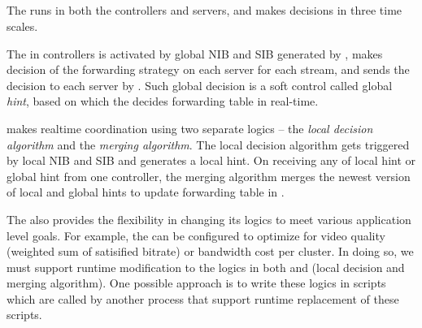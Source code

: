\subsection{\Decision}

The \decision runs in both the controllers and servers, and makes decisions in three time scales.

 The \globalControl in controllers is activated by global NIB and SIB generated by \discovery, makes decision of the forwarding strategy on each server for each stream, and sends the decision to each server by \dissemination. Such global decision is a soft control called global {\it hint}, based on which the \localControl decides forwarding table in real-time. 

 \localControl makes realtime coordination using two separate logics -- the {\it local decision algorithm} and the {\it merging algorithm}. The local decision algorithm gets triggered by local NIB and SIB and generates a local hint. On receiving any of local hint or global hint from one controller, the merging algorithm merges the newest version of local and global hints to update forwarding table in \data.

 The \decision also provides the flexibility in changing its logics to meet various application level goals. For example, the \decision can be configured to optimize for video quality (weighted sum of satisified bitrate) or bandwidth cost per cluster. In doing so, we must support runtime modification to the logics in both \globalControl and \localControl (local decision and merging algorithm). One possible approach is to write these logics in scripts which are called by another process that support runtime replacement of these scripts.









